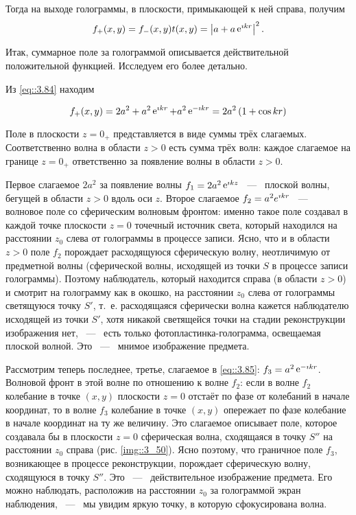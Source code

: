 Тогда на выходе голограммы, в плоскости, примыкающей к ней справа, получим
\begin{equation}\label{eq::3.84}
  f_+(x,y) = f_-(x,y)t(x,y) = \left|a +  a\mathop{\mathrm e}\nolimits^{\imath kr}\right|^2.
\end{equation}

Итак, суммарное поле за голограммой описывается действительной положительной функцией. Исследуем его более детально.

Из \eqref{eq::3.84} находим

\begin{equation}\label{eq::3.85}
  f_ +(x, y) = 2a^2 + a^2 \mathop{\mathrm e}\nolimits^{\imath kr} + a^2 \mathop{\mathrm e}\nolimits^{ -\imath kr} = 
  2a^2\left(1 + \cos{kr} \right)
\end{equation}

Поле в плоскости $z = 0_+$ представляется в виде суммы трёх слагаемых. Соответственно волна в области $z > 0$ есть сумма трёх волн: 
каждое слагаемое на границе $z = 0_+$ ответственно за появление 
волны в области $z > 0$.

Первое слагаемое $2a^2$  за появление волны $f_1 = 2a^2\mathop{\mathrm e}\nolimits^{\imath kz}$
~---~ плоской волны, бегущей в области $z > 0$ вдоль оси $z$. Второе слагаемое $f_2 = a^2e^{\imath kr}$ 
~---~ волновое поле со сферическим волновым фронтом:
именно такое поле создавал в каждой точке плоскости $z = 0$ точечный
источник света, который находился на расстоянии $z_0$ слева от голограммы в процессе записи. 
Ясно, что и в области $z > 0$ поле $f_2$ порождает расходящуюся сферическую волну, неотличимую от предметной волны
(сферической волны, исходящей из точки $S$ в процессе записи голограммы). 
Поэтому наблюдатель, который находится справа (в области $z > 0$) и смотрит на голограмму как в окошко,  на расстоянии 
$z_0$ слева от голограммы светящуюся точку $S'$, т.~е. расходящаяся сферически волна кажется наблюдателю исходящей из точки
$S'$, хотя никакой светящейся точки на стадии реконструкции изображения нет, ~---~ есть только фотопластинка-голограмма, освещаемая плоской волной. 
Это ~---~ мнимое изображение предмета.

Рассмотрим теперь последнее, третье, слагаемое в \eqref{eq::3.85}:
$f_3 = a^2\mathop{\mathrm e}\nolimits^{-\imath kr}$. Волновой фронт в этой волне  по отношению к волне $f_2$:
если в волне $f_2$ колебание в точке $(x,y)$ плоскости $z = 0$ отстаёт по фазе от колебаний в начале координат, то в
волне $f_3$ колебание в точке $(x,y)$ опережает по фазе колебание в начале
координат на ту же величину. Это слагаемое описывает поле, которое
создавала бы в плоскости $z = 0$ сферическая волна, сходящаяся в
точку $S''$ на расстоянии $z_0$ справа (рис. \ref{img::3_50}). 
Ясно поэтому, что граничное поле $f_3$, возникающее в процессе реконструкции, порождает сферическую волну, сходящуюся в точку $S''$. 
Это ~---~ действительное изображение предмета.
Его можно наблюдать, расположив на расстоянии $z_0$ за голограммой экран наблюдения, ~---~ мы увидим яркую точку, в которую сфокусирована волна.

